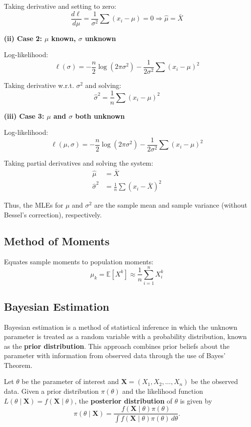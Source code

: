 \documentclass[twoside]{book}
\begin{document}
Taking derivative and setting to zero:
\[
\frac{d\ell}{d\mu} = \frac{1}{\sigma^2} \sum (x_i - \mu) = 0 \Rightarrow \hat{\mu} = \bar{X}
\]

\textbf{(ii) Case 2: \( \mu \) known, \( \sigma \) unknown}

Log-likelihood:
\[
\ell(\sigma) = -\frac{n}{2} \log(2\pi\sigma^2) - \frac{1}{2\sigma^2} \sum (x_i - \mu)^2
\]

Taking derivative w.r.t. \( \sigma^2 \) and solving:
\[
\hat{\sigma}^2 = \frac{1}{n} \sum (x_i - \mu)^2
\]

\textbf{(iii) Case 3: \( \mu \) and \( \sigma \) both unknown}

Log-likelihood:
\[
\ell(\mu, \sigma) = -\frac{n}{2} \log(2\pi\sigma^2) - \frac{1}{2\sigma^2} \sum (x_i - \mu)^2
\]

Taking partial derivatives and solving the system:
\begin{align*}
\hat{\mu} &= \bar{X} \\
\hat{\sigma}^2 &= \frac{1}{n} \sum (x_i - \bar{X})^2
\end{align*}

Thus, the MLEs for \( \mu \) and \( \sigma^2 \) are the sample mean and sample variance (without Bessel's correction), respectively.




\subsection{Method of Moments}
Equates sample moments to population moments:
\[
\mu_k = \mathbb{E}[X^k] \approx \frac{1}{n} \sum_{i=1}^n X_i^k
\]

\subsection{Bayesian Estimation}

Bayesian estimation is a method of statistical inference in which the unknown parameter is treated as a random variable with a probability distribution, known as the \textbf{prior distribution}. This approach combines prior beliefs about the parameter with information from observed data through the use of Bayes' Theorem.

Let \(\theta\) be the parameter of interest and \(\mathbf{X} = (X_1, X_2, \dots, X_n)\) be the observed data. Given a prior distribution \( \pi(\theta) \) and the likelihood function \( L(\theta \mid \mathbf{X}) = f(\mathbf{X} \mid \theta) \), the \textbf{posterior distribution} of \(\theta\) is given by
\[
\pi(\theta \mid \mathbf{X}) = \frac{f(\mathbf{X} \mid \theta) \pi(\theta)}{\int f(\mathbf{X} \mid \theta) \pi(\theta) \, d\theta}.
\]
\end{document}
